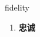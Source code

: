 
\begin{frame}
{\huge fidelity}
\begin{center}
\begin{enumerate}\Large
  \item \textbf{忠诚}
\end{enumerate}
\end{center}
\end{frame}
